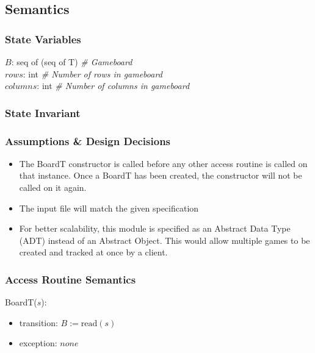 \documentclass[12pt]{article}
\begin{document}
\subsection* {Semantics}

\subsubsection* {State Variables}

$B$: seq of (seq of T) \textit{\# Gameboard}\\
$rows$: int \textit{\# Number of rows in gameboard}\\
$columns$: int \textit{\# Number of columns in gameboard}\\

\subsubsection* {State Invariant}

\subsubsection* {Assumptions \& Design Decisions}

\begin{itemize}

\item The BoardT constructor is called before any other access
  routine is called on that instance. Once a BoardT has been created, the
  constructor will not be called on it again.

\item The input file will match the given specification

\item For better scalability, this module is specified as an Abstract Data Type
  (ADT) instead of an Abstract Object. This would allow multiple games to be
  created and tracked at once by a client.

\end{itemize}

\subsubsection* {Access Routine Semantics}

\noindent BoardT($\mathit{s}$):
\begin{itemize}
\item transition: 
$B := \text{read}(s) $

\item exception: $ none$
\end{itemize}
\end{document}
